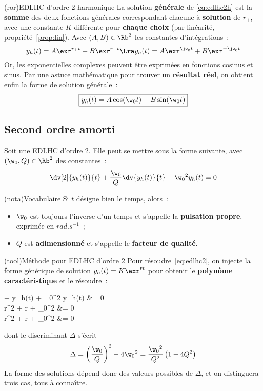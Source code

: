 \documentclass[a4paper, 11pt, garamond]{book}
\begin{document}
\begin{tcn}(ror){EDLHC d'ordre 2 harmonique}
	La solution \textbf{générale} de \eqref{eq:edlhc2h} est la \textbf{somme} des
	deux fonctions générales correspondant chacune à \textbf{solution} de
	$r_{\pm}$, avec une constante $K$ différente pour \textbf{chaque choix} (par
	linéarité, propriété~\ref{prop:lin}).
	\smallbreak
	Avec $(A,B) \in \Rb^{2}$ les constantes d'intégrations~:
	\[
		y_h(t) = A\exr^{r_+t} + B\exr^{r_-t}
		\Lra
		y_h(t) = A\exr^{\jw_0t} + B\exr^{-\jw_0t}
	\]
	Or, les exponentielles complexes peuvent être exprimées en fonctions cosinus
	et sinus. Par une astuce mathématique pour trouver un \textbf{résultat
		réel}, on obtient enfin la forme de solution générale~:
	\[
		\boxed{
			y_h(t) = A\cos(\w_0t) + B\sin(\w_0t)
		}
	\]
\end{tcn}

\subsection{Second ordre amorti}

Soit une EDLHC d'ordre 2. Elle peut se mettre sous la forme suivante, avec
$(\w_0,Q) \in \Rb^{2}$ des constantes~:
\begin{equation}
	\dv[2]{y_h(t)}{t} + \frac{\w_0}{Q}\dv{y_h(t)}{t} + \w_0{}^{2} y_h(t) = 0
	\label{eq:edlhc2}
\end{equation}

\begin{tcn}(nota){Vocabulaire}
	Si $t$ désigne bien le temps, alors~:
	\begin{itemize}
		\item $\w_0$ est toujours l'inverse d'un temps et s'appelle la
		      \textbf{pulsation propre}, exprimée en $\si{rad.s^{-1}}$~;
		\item $Q$ est \textbf{adimensionné} et s'appelle le \textbf{facteur de
			      qualité}.
	\end{itemize}
\end{tcn}

\begin{tcn}[breakable](tool){Méthode pour EDLHC d'ordre 2}
	Pour résoudre~\eqref{eq:edlhc2}, on injecte la forme générique de solution
	$y_h(t) = K \exr^{rt}$ pour obtenir le \textbf{polynôme caractéristique} et le
	résoudre~:
	\begin{DispWithArrows}
		 +
		y_h(t) +
		\w_0{}^2 y_h(t) &= 0
		\notag
		\\\Ra
		r^2 \times {} +
		r  +
		\w_0{}^2 &= 0
		\notag
		\\\Lra
		r^{2} + r + \w_0^{2} &= 0
		\label{eq:polcar}
	\end{DispWithArrows}
	dont le discriminant $\Delta$ s'écrit
	\[
		\Delta =
		\left( \frac{\w_0}{Q} \right)^{2} - 4\w_0{}^{2} =
		\frac{\w_0{}^{2}}{Q^{2}} \left( 1 -4Q^{2} \right)
	\]
	La forme des solutions dépend donc des valeurs possibles de $\Delta$, et on
	distinguera trois cas, tous à connaître.
\end{tcn}
\end{document}
